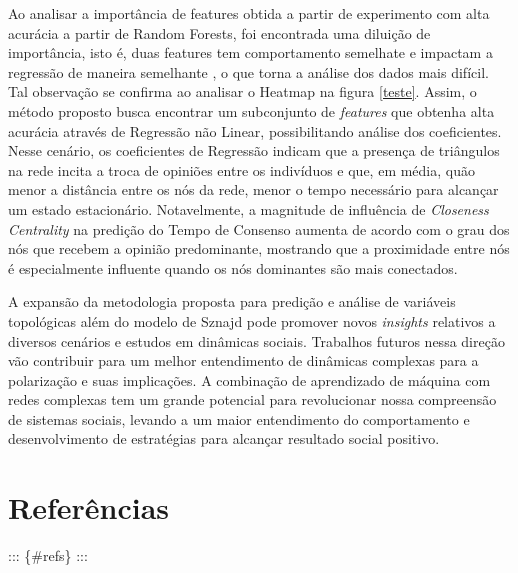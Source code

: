 Ao analisar a importância de features obtida a partir de experimento com
alta acurácia a partir de Random Forests, foi encontrada uma diluição de
importância, isto é, duas features tem comportamento semelhate e
impactam a regressão de maneira semelhante , o que torna a análise dos
dados mais difícil. Tal observação se confirma ao analisar o Heatmap na
figura \ref{teste}. Assim, o método proposto busca encontrar um
subconjunto de \emph{features} que obtenha alta acurácia através de
Regressão não Linear, possibilitando análise dos coeficientes. Nesse
cenário, os coeficientes de Regressão indicam que a presença de
triângulos na rede incita a troca de opiniões entre os indivíduos e que,
em média, quão menor a distância entre os nós da rede, menor o tempo
necessário para alcançar um estado estacionário. Notavelmente, a
magnitude de influência de \emph{Closeness Centrality} na predição do
Tempo de Consenso aumenta de acordo com o grau dos nós que recebem a
opinião predominante, mostrando que a proximidade entre nós é
especialmente influente quando os nós dominantes são mais conectados.

A expansão da metodologia proposta para predição e análise de variáveis
topológicas além do modelo de Sznajd pode promover novos \emph{insights}
relativos a diversos cenários e estudos em dinâmicas sociais. Trabalhos
futuros nessa direção vão contribuir para um melhor entendimento de
dinâmicas complexas para a polarização e suas implicações. A combinação
de aprendizado de máquina com redes complexas tem um grande potencial
para revolucionar nossa compreensão de sistemas sociais, levando a um
maior entendimento do comportamento e desenvolvimento de estratégias
para alcançar resultado social positivo.

\section{Referências}\label{referuxeancias}

::: \{\#refs\} :::
